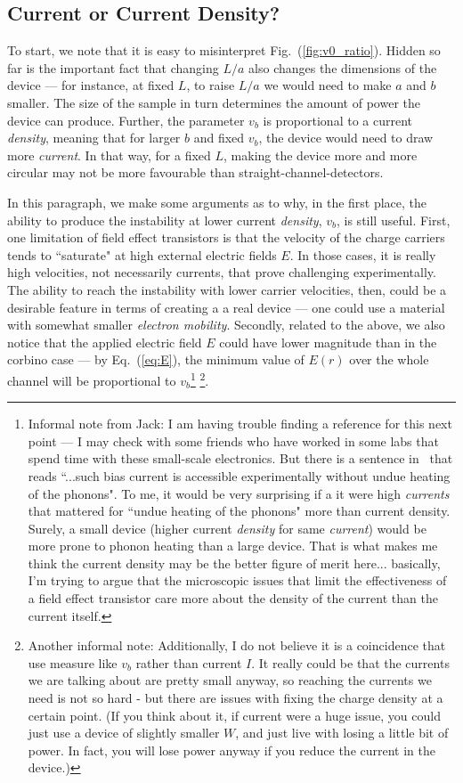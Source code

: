 \documentclass[12pt]{article}
\begin{document}
\subsection{Current or Current Density?} 
To start, we note that it is easy to misinterpret Fig.~(\ref{fig:v0_ratio}).  Hidden so far is the important fact that changing $L/a$ also changes the dimensions of the device --- for instance, at fixed $L$, to raise $L/a$ we would need to make $a$ and $b$ smaller.  The size of the sample in turn determines the amount of power the device can produce.  Further, the parameter $v_b$ is proportional to a current \textit{density}, meaning that for larger $b$ and fixed $v_b$, the device would need to draw more \textit{current}.  In that way, for a fixed $L$, making the device more and more circular may not be more favourable than straight-channel-detectors.

In this paragraph, we make some arguments as to why, in the first place, the ability to produce the instability at lower current \textit{density}, $v_b$, is still useful.  First, one limitation of field effect transistors is that the velocity of the charge carriers tends to ``saturate" at high external electric fields $E$.  In those cases, it is really high velocities, not necessarily currents, that prove challenging experimentally.  The ability to reach the instability with lower carrier velocities, then, could be a desirable feature in terms of creating a a real device --- one could use a material with somewhat smaller \textit{electron mobility}.  Secondly, related to the above, we also notice that the applied electric field $E$ could have lower magnitude than in the corbino case --- by Eq.~(\ref{eq:E}), the minimum value of $E(r)$ over the whole channel will be proportional to $v_b$\footnote{Informal note from Jack: I am having trouble finding a reference for this next point --- I may check with some friends who have worked in some labs that spend time with these small-scale electronics.  But there is a sentence in~\cite{Mendl2019} that reads ``...such bias current is accessible experimentally without undue heating of the phonons". To me, it would be very surprising if a it were high \textit{currents} that mattered for ``undue heating of the phonons" more than current density.  Surely, a small device (higher current \textit{density} for same \textit{current}) would be more prone to phonon heating than a large device.  That is what makes me think the current density may be the better figure of merit here... basically, I'm trying to argue that the microscopic issues that limit the effectiveness of a field effect transistor care more about the density of the current than the current itself.} \footnote{Another informal note: Additionally, I do not believe it is a coincidence that~\cite{Mendl2019} use measure like $v_b$ rather than current $I$.  It really could be that the currents we are talking about are pretty small anyway, so reaching the currents we need is not so hard - but there are issues with fixing the charge density at a certain point.  (If you think about it, if current were a huge issue, you could just use a device of slightly smaller $W$, and just live with losing a little bit of power.  In fact, you will lose power anyway if you reduce the current in the device.)}.
\end{document}
